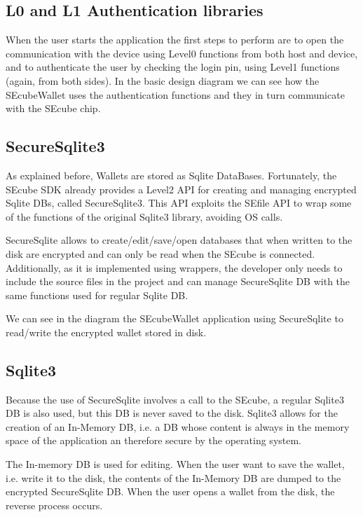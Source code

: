 \subsection{L0 and L1 Authentication libraries}

When the user starts the application the first steps to perform are to open the communication with the device using Level0 functions from both host and device, and to authenticate the user by checking the login pin, using Level1 functions (again, from both sides). In the basic design diagram we can see how the SEcubeWallet uses the authentication functions and they in turn communicate with the SEcube chip.

\subsection{SecureSqlite3}
As explained before, Wallets are stored as Sqlite DataBases. Fortunately, the SEcube SDK already provides a Level2 API for creating and managing encrypted Sqlite DBs, called SecureSqlite3. This API exploits the SEfile API to wrap some of the functions of the original Sqlite3 library, avoiding OS calls.

SecureSqlite allows to create/edit/save/open databases that when written to the disk are encrypted and can only be read when the SEcube is connected. Additionally, as it is implemented using wrappers, the developer only needs to include the source files in the project and can manage SecureSqlite DB with the same functions used for regular Sqlite DB.

We can see in the diagram the SEcubeWallet application using SecureSqlite to read/write the encrypted wallet stored in disk.

\subsection{Sqlite3}
Because the use of SecureSqlite involves a call to the SEcube, a regular Sqlite3 DB is also used, but this DB is never saved to the disk. Sqlite3 allows for the creation of an In-Memory DB, i.e. a DB whose content is always in the memory space of the application an therefore secure by the operating system. 

The In-memory DB is used for editing. When the user want to save the wallet, i.e. write it to the disk, the contents of the In-Memory DB are dumped to the encrypted SecureSqlite DB. When the user opens a wallet from the disk, the reverse process occurs.

